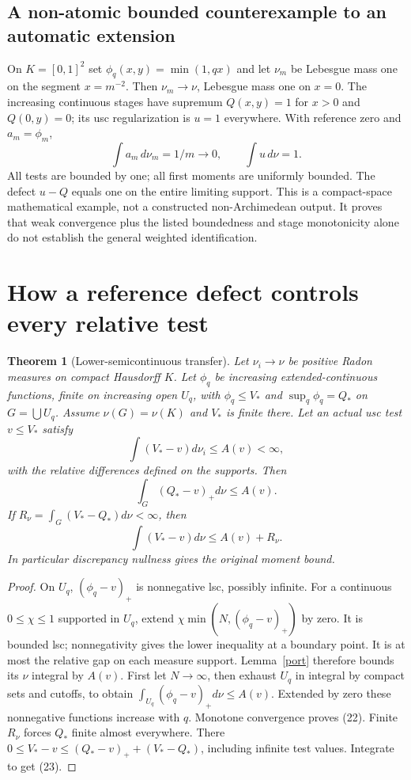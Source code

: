 \documentclass[10pt]{article}
\newtheorem{theorem}{Theorem}[section]
\begin{document}
\subsection{A non-atomic bounded counterexample to an automatic extension}
On $K=[0,1]^2$ set $\phi_q(x,y)=\min(1,qx)$ and
let $\nu_m$ be Lebesgue mass one on the segment $x=m^{-2}$.
Then $\nu_m\to\nu$, Lebesgue mass one on $x=0$.
The increasing continuous stages have supremum
$Q(x,y)=1$ for $x>0$ and $Q(0,y)=0$; its usc regularization is
$u=1$ everywhere. With reference zero and $a_m=\phi_m$,
\[
 \int a_m\,d\nu_m=1/m\to0,\qquad\int u\,d\nu=1.             \tag{21}
\]
All tests are bounded by one; all first moments are uniformly bounded.
The defect $u-Q$ equals one on the entire limiting support.
This is a compact-space mathematical example, not a constructed
non-Archimedean output. It proves that weak convergence plus the
listed boundedness and stage monotonicity alone do not establish the
general weighted identification.

\section{How a reference defect controls every relative test}
\begin{theorem}[Lower-semicontinuous transfer]\label{integration}
Let $\nu_i\to\nu$ be positive Radon measures on compact Hausdorff $K$.
Let $\phi_q$ be increasing extended-continuous functions, finite on
increasing open $U_q$, with $\phi_q\leq V_*$ and $\sup_q\phi_q=Q_*$
on $G=\bigcup U_q$. Assume $\nu(G)=\nu(K)$ and $V_*$ is finite there.
Let an actual usc test $v\leq V_*$ satisfy
\[
 \int(V_*-v)d\nu_i\leq A(v)<\infty,
\]
with the relative differences defined on the supports.
Then
\[
 \int_G(Q_*-v)_+d\nu\leq A(v).                              \tag{22}
\]
If $R_\nu=\int_G(V_*-Q_*)d\nu<\infty$, then
\[
 \int(V_*-v)d\nu\leq A(v)+R_\nu.                            \tag{23}
\]
In particular discrepancy nullness gives the original moment bound.
\end{theorem}
\begin{proof}
On $U_q$, $(\phi_q-v)_+$ is nonnegative lsc, possibly infinite.
For a continuous $0\leq\chi\leq1$ supported in $U_q$,
extend $\chi\min(N,(\phi_q-v)_+)$ by zero. It is bounded lsc;
nonnegativity gives the lower inequality at a boundary point.
It is at most the relative gap on each measure support.
Lemma~\ref{port} therefore bounds its $\nu$ integral by $A(v)$.
First let $N\to\infty$, then exhaust $U_q$ in integral by compact
sets and cutoffs, to obtain
$\int_{U_q}(\phi_q-v)_+d\nu\leq A(v)$.
Extended by zero these nonnegative functions increase with $q$.
Monotone convergence proves (22).
Finite $R_\nu$ forces $Q_*$ finite almost everywhere.
There
$0\leq V_*-v\leq(Q_*-v)_++(V_*-Q_*)$,
including infinite test values. Integrate to get (23).
\end{proof}
\end{document}
